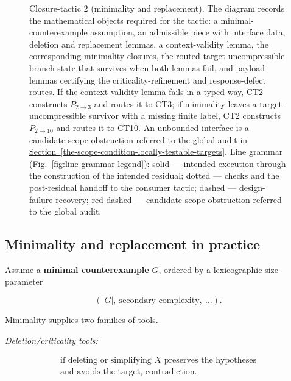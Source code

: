 \documentclass[
  11pt,
]{article}
\theoremstyle{definition}
\newcommand{\secref}[1]{\hyperref[#1]{Section~\ref*{#1}}}
\begin{document}
\begin{figure}[p]
{%
}
\caption[Closure-tactic 2: minimality and replacement]{Closure-tactic 2 (minimality and replacement).  The diagram records the mathematical objects required for the tactic: a minimal-counterexample assumption, an admissible piece with interface data, deletion and replacement lemmas, a context-validity lemma, the corresponding minimality closures, the routed target-uncompressible branch state that survives when both lemmas fail, and payload lemmas certifying the criticality-refinement and response-defect routes.  If the context-validity lemma fails in a typed way, CT2 constructs \(P_{2\to3}\) and routes it to CT3; if minimality leaves a target-uncompressible survivor with a missing finite label, CT2 constructs \(P_{2\to10}\) and routes it to CT10.  An unbounded interface is a candidate scope obstruction referred to the global audit in \secref{the-scope-condition-locally-testable-targets}.  Line grammar (Fig.~\ref{fig:line-grammar-legend}): solid --- intended execution through the construction of the intended residual; dotted --- checks and the post-residual handoff to the consumer tactic; dashed --- design-failure recovery; red-dashed --- candidate scope obstruction referred to the global audit.}
\label{fig:ct2-minimality-replacement}
\end{figure}
\FloatBarrier

\subsection*{Minimality and replacement in practice}

Assume a \textbf{minimal counterexample} \(G\), ordered by a
lexicographic size parameter

\[
(|G|,\ \text{secondary complexity},\ \ldots).
\]

Minimality supplies two families of tools.

\emph{Deletion/criticality tools:}

\[
\begin{gathered}
\text{if deleting or simplifying } X \text{ preserves the hypotheses}\\
\text{and avoids the target, contradiction.}
\end{gathered}
\]
\end{document}
